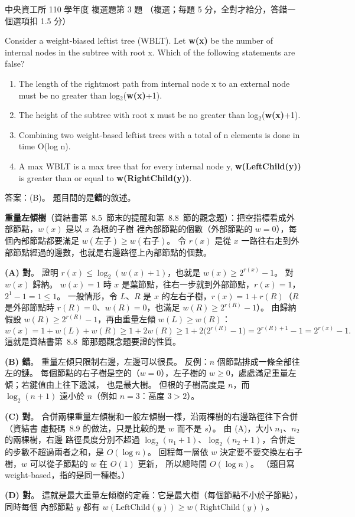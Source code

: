 \begin{pastexam}[label={px:ncu-110-dsa-03}]{中央資工所 110 學年度 複選題第 3 題}
（複選；每題 5 分，全對才給分，答錯一個選項扣 1.5 分）

Consider a weight-biased leftist tree (WBLT). Let \textbf{w(x)} be the number of internal nodes in
the subtree with root x. Which of the following statements are false?
\begin{enumerate}[label=(\Alph*)]
\item The length of the rightmost path from internal node x to an external node must be no greater
than log$_2$(\textbf{w(x)}+1).
\item The height of the subtree with root x must be no greater than log$_2$(\textbf{w(x)}+1).
\item Combining two weight-based leftist trees with a total of n elements is done in time O(log n).
\item A max WBLT is a max tree that for every internal node y, \textbf{w(LeftChild(y))} is greater
than or equal to \textbf{w(RightChild(y))}.
\end{enumerate}
\end{pastexam}

\begin{pastsoln}
答案：(B)。 題目問的是\textbf{錯}的敘述。

\textbf{重量左傾樹}（資結書第~8.5~節末的提醒和第~8.8~節的觀念題）：把空指標看成外部節點，$w(x)$ 是以 $x$ 為根的子樹
裡內部節點的個數（外部節點的 $w = 0$），每個內部節點都要滿足 $w(\text{左子}) \ge w(\text{右子})$。
令 $r(x)$ 是從 $x$ 一路往右走到外部節點經過的邊數，也就是右邊路徑上內部節點的個數。

\textbf{(A) 對}。 證明 $r(x) \le \log_2(w(x) + 1)$，也就是 $w(x) \ge 2^{r(x)} - 1$。 對 $w(x)$ 歸納。
$w(x) = 1$ 時 $x$ 是葉節點，往右一步就到外部節點，$r(x) = 1$，$2^1 - 1 = 1 \le 1$。 一般情形，令
$L$、$R$ 是 $x$ 的左右子樹，$r(x) = 1 + r(R)$（$R$ 是外部節點時 $r(R) = 0$、$w(R) = 0$，也滿足
$w(R) \ge 2^{r(R)} - 1$）。 由歸納假設 $w(R) \ge 2^{r(R)} - 1$，再由重量左傾 $w(L) \ge w(R)$：
\[
w(x) = 1 + w(L) + w(R) \ge 1 + 2w(R) \ge 1 + 2\bigl(2^{r(R)} - 1\bigr) = 2^{r(R) + 1} - 1 = 2^{r(x)} - 1.
\]
這就是資結書第~8.8~節那題觀念題要證的性質。

\textbf{(B) 錯}。 重量左傾只限制右邊，左邊可以很長。 反例：$n$ 個節點排成一條全部往左的鏈。
每個節點的右子樹是空的（$w = 0$），左子樹的 $w \ge 0$，處處滿足重量左傾；若鍵值由上往下遞減，
也是最大樹。 但根的子樹高度是 $n$，而 $\log_2(n + 1)$ 遠小於 $n$（例如 $n = 3$：高度 $3 > 2$）。

\textbf{(C) 對}。 合併兩棵重量左傾樹和一般左傾樹一樣，沿兩棵樹的右邊路徑往下合併（資結書
虛擬碼~8.9 的做法，只是比較的是 $w$ 而不是 $s$）。 由 (A)，大小 $n_1$、$n_2$ 的兩棵樹，右邊
路徑長度分別不超過 $\log_2(n_1 + 1)$、$\log_2(n_2 + 1)$，合併走的步數不超過兩者之和，是
$O(\log n)$。 回程每一層依 $w$ 決定要不要交換左右子樹，$w$ 可以從子節點的 $w$ 在 $O(1)$ 更新，
所以總時間 $O(\log n)$。 （題目寫 weight-based，指的是同一種樹。）

\textbf{(D) 對}。 這就是最大重量左傾樹的定義：它是最大樹（每個節點不小於子節點），同時每個
內部節點 $y$ 都有 $w(\text{LeftChild}(y)) \ge w(\text{RightChild}(y))$。
\end{pastsoln}
